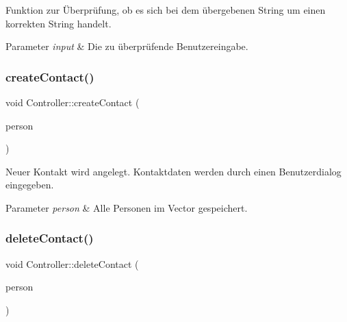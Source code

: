 Funktion zur Überprüfung, ob es sich bei dem übergebenen String um einen korrekten String handelt.


\begin{DoxyParams}{Parameter}
{\em input} & Die zu überprüfende Benutzereingabe.\\
\hline
\end{DoxyParams}
\mbox{\label{classContactManager_1_1Controller_a6f5ce489625a26dc82f3473b63cc4336}} 
\subsubsection{\texorpdfstring{create\+Contact()}{createContact()}}
{\footnotesize\ttfamily void Controller\+::create\+Contact (\begin{DoxyParamCaption}\item[{vector$<$ \hyperlink{classContactManager_1_1Person}{Person} $>$ \&}]{person }\end{DoxyParamCaption})}



Neuer Kontakt wird angelegt. Kontaktdaten werden durch einen Benutzerdialog eingegeben.


\begin{DoxyParams}{Parameter}
{\em person} & Alle Personen im Vector gespeichert.\\
\hline
\end{DoxyParams}
\mbox{\label{classContactManager_1_1Controller_a87af8bc174a36e01cedb9a892a6b6aa0}} 
\subsubsection{\texorpdfstring{delete\+Contact()}{deleteContact()}}
{\footnotesize\ttfamily void Controller\+::delete\+Contact (\begin{DoxyParamCaption}\item[{vector$<$ \hyperlink{classContactManager_1_1Person}{Person} $>$ \&}]{person }\end{DoxyParamCaption})}



